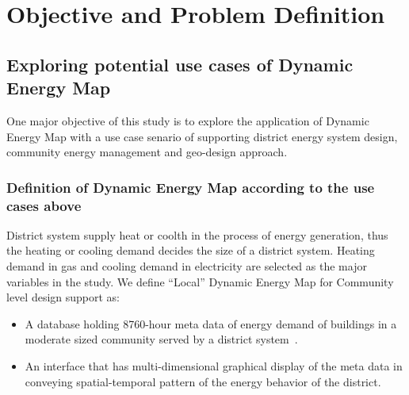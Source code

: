 \documentclass[hidelinks,12pt]{article}
\begin{document}
\section{Objective and Problem Definition}
\subsection{Exploring potential use cases of Dynamic Energy Map}
One major objective of this study is to explore the application of
Dynamic Energy Map with a use case senario of supporting district
energy system design, community energy management and geo-design
approach.

\subsubsection{Definition of Dynamic Energy Map according to the use
  cases above}
District system supply heat or coolth in the process of energy
generation, thus the heating or cooling demand decides the size of a
district system. Heating demand in gas and cooling demand in
electricity are selected as the major variables in the study. We
define ``Local'' Dynamic Energy Map for Community level design support
as:
\begin{itemize}
\item A database holding 8760-hour meta data of energy demand of
  buildings in a moderate sized community served by a district
  system~\cite{baird2014}.
\item An interface that has multi-dimensional graphical display of the
  meta data in conveying spatial-temporal pattern of the energy
  behavior of the district.
\end{itemize}
\end{document}
